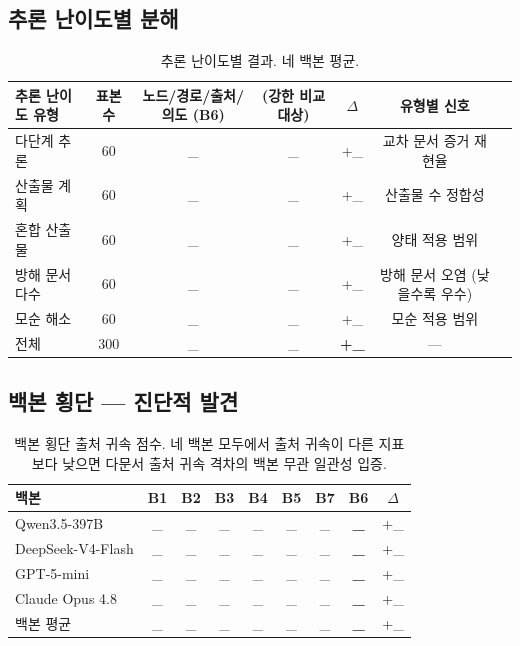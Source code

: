 \documentclass[11pt]{article}
\begin{document}
\subsection{추론 난이도별 분해}

\begin{table}[h]
\centering
\small
\begin{tabular}{l|c|cccc|c}
\toprule
추론 난이도 유형 & 표본 수 & 노드/경로/출처/의도 (B6) & (강한 비교 대상) & $\Delta$ & 유형별 신호 \\
\midrule
다단계 추론 & 60 & \_ & \_ & +\_ & 교차 문서 증거 재현율 \\
산출물 계획 & 60 & \_ & \_ & +\_ & 산출물 수 정합성 \\
혼합 산출물 & 60 & \_ & \_ & +\_ & 양태 적용 범위 \\
방해 문서 다수 & 60 & \_ & \_ & +\_ & 방해 문서 오염 (낮을수록 우수) \\
모순 해소 & 60 & \_ & \_ & +\_ & 모순 적용 범위 \\
\midrule
전체 & 300 & \_ & \_ & \textbf{+\_} & — \\
\bottomrule
\end{tabular}
\caption{추론 난이도별 결과. 네 백본 평균.}
\label{tab:t3}
\end{table}

\subsection{백본 횡단 — 진단적 발견}

\begin{table}[h]
\centering
\small
\begin{tabular}{l|ccccccc|c}
\toprule
백본 & B1 & B2 & B3 & B4 & B5 & B7 & \textbf{B6} & $\Delta$ \\
\midrule
Qwen3.5-397B & \_ & \_ & \_ & \_ & \_ & \_ & \textbf{\_} & +\_ \\
DeepSeek-V4-Flash & \_ & \_ & \_ & \_ & \_ & \_ & \textbf{\_} & +\_ \\
GPT-5-mini & \_ & \_ & \_ & \_ & \_ & \_ & \textbf{\_} & +\_ \\
Claude Opus 4.8 & \_ & \_ & \_ & \_ & \_ & \_ & \textbf{\_} & +\_ \\
\midrule
백본 평균 & \_ & \_ & \_ & \_ & \_ & \_ & \textbf{\_} & +\_ \\
\bottomrule
\end{tabular}
\caption{백본 횡단 출처 귀속 점수. 네 백본 모두에서 출처 귀속이 다른 지표보다 낮으면 다문서 출처 귀속 격차의 백본 무관 일관성 입증.}
\label{tab:t4}
\end{table}
\end{document}
